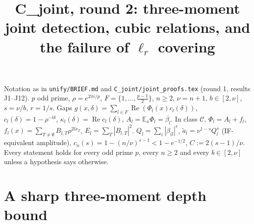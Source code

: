 \documentclass[11pt]{article}
\title{C\_joint, round 2: three-moment joint detection, cubic relations, and the failure of $\ell_r$ covering}
\date{}
\theoremstyle{remark}
\renewcommand{\Re}{\operatorname{Re}}
\begin{document}
\maketitle

\noindent Notation as in \texttt{unify/BRIEF.md} and \texttt{C\_joint/joint\_proofs.tex} (round 1, results J1--J12).
$p$ odd prime, $\rho=e^{2\pi i/p}$, $F=\{1,\dots,\tfrac{p-1}2\}$, $n\ge2$, $\nu=n+1$, $b\in[2,\nu]$, $s=\nu/b$, $r=1/s$.
Gaps $g(x,\delta)=\sum_{l\in F}\Re(\Phi_l(x)c_l(\delta))$, $c_l(\delta)=1-\rho^{-l\delta}$, $\kappa_l(\delta)=\Re c_l(\delta)$,
$A_l=\mathbb E_x\Phi_l=\overline{\beta_l}$. In class $\mathcal C$, $\Phi_l=A_l+f_l$, $f_l(x)=\sum_{T\neq\emptyset}B_{l,T}\rho^{2l x_T}$,
$E_l=\sum_T|B_{l,T}|^2$. $Q_l=\sum_i|\beta_{il}|^r$, $\tilde a_l=\nu^{1-s}Q_l^s$ (IF-equivalent amplitude),
$c_n(s)=1-(n/\nu)^{s-1}<1-e^{-1/2}$, $C:=2(s-1)/\nu$. Every statement holds for every odd prime $p$, every $n\ge2$ and every
$b\in[2,\nu]$ unless a hypothesis says otherwise.

\section{A sharp three-moment depth bound}
\end{document}
